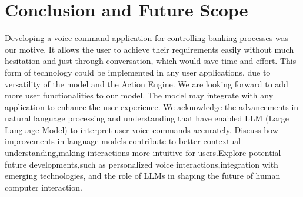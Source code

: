 \chapter{Conclusion and Future Scope}

Developing a voice command application for controlling banking processes was our motive. It allows the user to achieve their requirements easily without much hesitation and just through conversation, which would save time and effort. This form of technology could be implemented in any user applications, due to versatility of the model and the Action Engine. We are looking forward to add more user functionalities to our model. The model may integrate with any application to enhance the user experience. We acknowledge the advancements in natural language processing and understanding that have enabled LLM (Large Language Model) to interpret user voice commands accurately. Discuss how improvements in language models contribute to better  contextual understanding,making interactions more intuitive for users.Explore potential future developments,such as personalized voice interactions,integration with emerging technologies, and the role of LLMs in shaping the future of human computer interaction.     